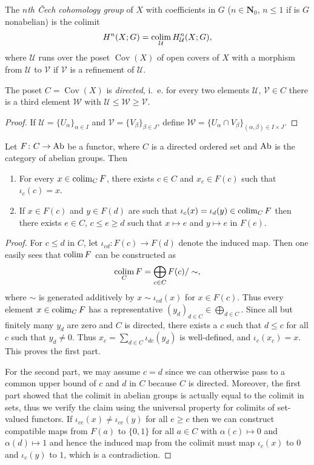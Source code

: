 \documentclass[a4paper,openany]{scrbook}
\DeclareMathOperator{\Cov}{Cov}
\begin{document}
\begin{defn}
The \emph{$n$th Čech cohomology group} of $X$ with coefficients in $G$ ($n \in \mathbf N_0$, $n \leq 1$ if is $G$ nonabelian) is the colimit
\[
H^n(X;G) = \colim_{\mathcal U} H^n_{\mathcal U}(X;G),
\]
where $\mathcal U$ runs over the poset $\Cov(X)$ of open covers of $X$ with a morphism from $\mathcal U$ to $\mathcal V$ if $\mathcal V$ is a refinement of $\mathcal U$.
\end{defn}


\begin{lemma}
The poset $C = \Cov(X)$ is \emph{directed}, i.~e. for every two elements $\mathcal U$, $\mathcal V \in C$ there is a third element $\mathcal W$ with $\mathcal U \leq \mathcal W \geq \mathcal V$.
\end{lemma}
\begin{proof}
If $\mathcal U = \{U_\alpha\}_{\alpha \in I}$ and $\mathcal V = \{V_\beta\}_{\beta \in J}$, define $\mathcal W = \{U_\alpha \cap V_\beta\}_{(\alpha,\beta) \in I \times J}$.
\end{proof}

\begin{lemma}\label{lemma:dircolimitofabeliangroups}
Let $F\colon C \to \operatorname{Ab}$ be a functor, where $C$ is a directed ordered set and $\operatorname{Ab}$ is the category of abelian groups. Then
\begin{enumerate}
\item For every $x \in \colim_C F$, there exists $c \in C$ and $x_c \in F(c)$ such that $\iota_c(c)=x$.
\item If $x \in F(c)$ and $y \in F(d)$ are such that $\iota_c(x)=\iota_d(y) \in \colim_C F$ then there exists $e \in C$, $c \leq e \geq d$ such that $x \mapsto e$ and $y \mapsto e$ in $F(e)$.
\end{enumerate}
\end{lemma}
\begin{proof}
For $c \leq d$ in $C$, let $\iota_{cd}\colon F(c) \to F(d)$ denote the induced map. Then one easily sees that $\colim F$ can be constructed as
\[
\colim_C F = \bigoplus_{c \in C} F(c)/\sim,
\]
where $\sim$ is generated additively by $x \sim \iota_{cd}(x)$ for $x \in F(c)$. Thus every element $x \in \colim_C F$ has a representative $(y_d)_{d \in C} \in \bigoplus_{d \in C}$. Since all but finitely many $y_d$ are zero and $C$ is directed, there exists a $c$ such that $d \leq c$ for all $c$ such that $y_d \neq 0$. Thus $x_c = \sum_{d \in C} \iota_{dc}(y_d)$ is well-defined, and $\iota_c(x_c) = x$. This proves the first part.

For the second part, we may assume $c=d$ since we can otherwise pass to a common upper bound of $c$ and $d$ in $C$ because $C$ is directed. Moreover, the first part showed that the colimit in abelian groups is actually equal to the colimit in sets, thus we verify the claim using the universal property for colimits of set-valued functors.
If $\iota_{ce}(x) \neq \iota_{ce}(y)$ for all $e \geq c$ then we can construct compatible maps from $F(a)$ to $\{0,1\}$ for all $a \in C$ with $\alpha(c) \mapsto 0$ and $\alpha(d) \mapsto 1$ and hence the induced map from the colimit must map $\iota_c(x)$ to $0$ and $\iota_c(y)$ to $1$, which is a contradiction.
\end{proof}
\end{document}
